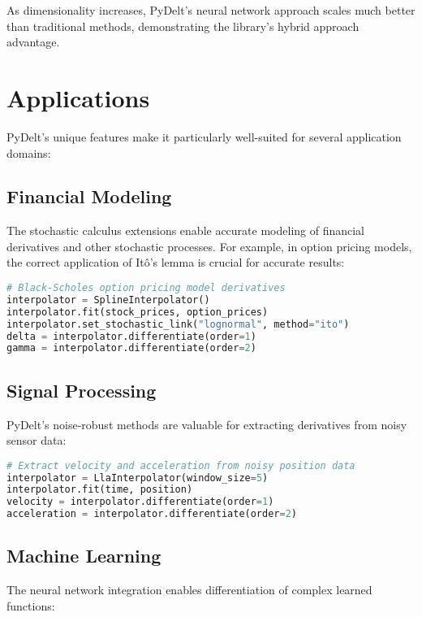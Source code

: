 \documentclass[11pt,a4paper]{article}
\begin{document}
As dimensionality increases, PyDelt's neural network approach scales much better than traditional methods, demonstrating the library's hybrid approach advantage.

\section{Applications}

PyDelt's unique features make it particularly well-suited for several application domains:

\subsection{Financial Modeling}

The stochastic calculus extensions enable accurate modeling of financial derivatives and other stochastic processes. For example, in option pricing models, the correct application of Itô's lemma is crucial for accurate results:

\begin{lstlisting}[language=Python, caption=Financial modeling example]
# Black-Scholes option pricing model derivatives
interpolator = SplineInterpolator()
interpolator.fit(stock_prices, option_prices)
interpolator.set_stochastic_link("lognormal", method="ito")
delta = interpolator.differentiate(order=1)
gamma = interpolator.differentiate(order=2)
\end{lstlisting}

\subsection{Signal Processing}

PyDelt's noise-robust methods are valuable for extracting derivatives from noisy sensor data:

\begin{lstlisting}[language=Python, caption=Signal processing example]
# Extract velocity and acceleration from noisy position data
interpolator = LlaInterpolator(window_size=5)
interpolator.fit(time, position)
velocity = interpolator.differentiate(order=1)
acceleration = interpolator.differentiate(order=2)
\end{lstlisting}

\subsection{Machine Learning}

The neural network integration enables differentiation of complex learned functions:
\end{document}
